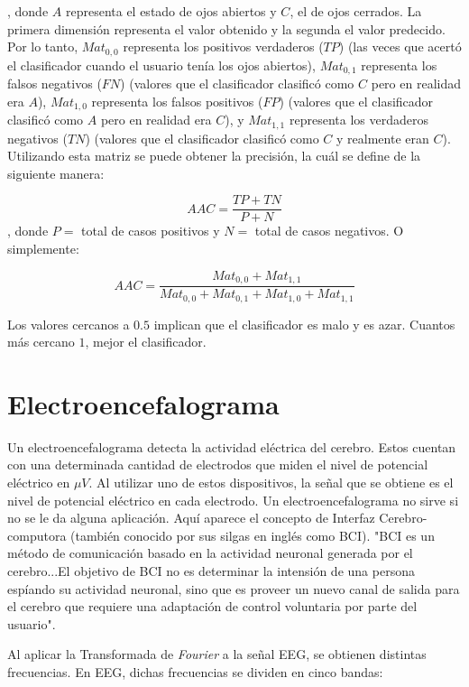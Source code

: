  , donde $ A $ representa el estado de ojos abiertos y $ C $, el de ojos cerrados. La primera dimensión representa el valor obtenido y la segunda el valor predecido. Por lo tanto, $Mat_{0,0}$ representa los positivos verdaderos ($TP$) (las veces que acertó el clasificador cuando el usuario tenía los ojos abiertos), $Mat_{0,1}$ representa los falsos negativos ($FN$) (valores que el clasificador clasificó como $C$ pero en realidad era $A$), $Mat_{1,0}$ representa los falsos positivos ($FP$) (valores que el clasificador clasificó como $A$ pero en realidad era $C$), y $Mat_{1,1}$ representa los verdaderos negativos ($TN$) (valores que el clasificador clasificó como $C$ y realmente eran $C$). Utilizando esta matriz se puede obtener la precisión, la cuál se define de la siguiente manera:
 
$$ AAC = \frac{TP + TN}{P + N} $$ 
, donde $P =$ total de casos positivos y $ N =$ total de casos negativos. O simplemente:

$$ AAC = \frac{Mat_{0,0} + Mat_{1,1}}{Mat_{0,0} + Mat_{0,1} + Mat_{1,0} + Mat_{1,1}} $$ 

Los valores cercanos a $0.5$ implican que el clasificador es malo y es azar. Cuantos más cercano $1$, mejor el clasificador.
 
\section{Electroencefalograma}

Un electroencefalograma detecta la actividad eléctrica del cerebro. Estos cuentan con una determinada cantidad de electrodos que miden el nivel de potencial eléctrico en $ \mu V$. Al utilizar uno de estos dispositivos, la señal que se obtiene es el nivel de potencial eléctrico en cada electrodo. Un electroencefalograma no sirve si no se le da alguna aplicación. Aquí aparece el concepto de Interfaz Cerebro-computora (también conocido por sus silgas en inglés como BCI). "BCI es un método de comunicación basado en la actividad neuronal generada por el cerebro...El objetivo de BCI no es determinar la intensión de una persona espíando su actividad neuronal, sino que es proveer un nuevo canal de salida para el cerebro que requiere una adaptación de control voluntaria por parte del usuario"\cite{neural-eng}.

Al aplicar la Transformada de \emph{Fourier} a la señal EEG, se obtienen distintas frecuencias. En EEG, dichas frecuencias se dividen en cinco bandas:

